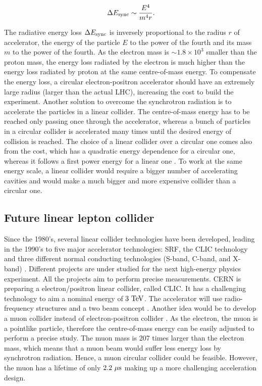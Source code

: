     \begin{equation}
     \Delta E_{\rm{sync}} \sim \frac{E^4}{m^4r}.
       \label{eq:Esynchrotron}
    \end{equation} 

    The radiative energy loss $\Delta E_{\rm{sync}}$ is inversely proportional to the radius $r$ of accelerator, the energy of the particle $E$ to the power of the fourth and its mass $m$ to the power of the fourth.
    As the electron mass is $\sim 1.8 \times 10^3$ smaller than the proton mass, the energy loss radiated by the electron is much higher than the energy loss radiated by proton at the same centre-of-mass energy.
    To compensate the energy loss, a circular electron-positron accelerator should have an extremely large radius (larger than the actual \gls{LHC}), increasing the cost to build the experiment.
    Another solution to overcome the synchrotron radiation is to accelerate the particles in a linear collider.
    The centre-of-mass energy has to be reached only passing once through the accelerator, whereas a bunch of particles in a circular collider is accelerated many times until the desired energy of collision is reached.
    The choice of a linear collider over a circular one comes also from the cost, which has a quadratic energy dependence for a circular one, whereas it follows a first power energy for a linear one \cite{Richter:1976ug}. 
    To work at the same energy scale, a linear collider would require a bigger number of accelerating cavities and would make a much bigger and more expensive collider than a circular one.

    \subsection{Future linear lepton collider}
    
    Since the 1980's, several linear collider technologies have been developed, leading in the 1990's to five major accelerator technologies: \gls{SRF}, the \gls{CLIC} technology and three different normal conducting technologies (S-band, C-band, and X-band) \cite{Desy1988}.
    Different projects are under studied for the next high-energy physics experiment. 
    All the projects aim to perform precise measurements.
    CERN is preparing a electron/positron linear collider, called \gls{CLIC}.
    It has a challenging technology to aim a nominal energy of $3~\rm{TeV}$.
    The accelerator will use radio-frequency structures and a two beam concept \cite{CLIC}.
    Another idea would be to develop a muon collider instead of electron-positron collider \cite{Lipton2012}.
    As the electron, the muon is a pointlike particle, therefore the centre-of-mass energy can be easily adjusted to perform a precise study.
    The muon mass is 207 times larger than the electron mass, which means that a muon beam would suffer less energy loss by synchrotron radiation.
    Hence, a muon circular collider could be feasible.
    However, the muon has a lifetime of only $2.2~\rm{\mu s}$ making up a more challenging acceleration design.
 
